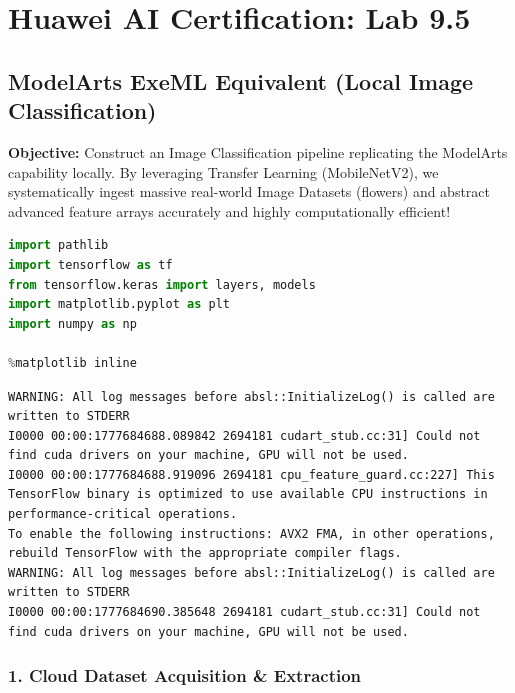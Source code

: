 \hypertarget{huawei-ai-certification-lab-9.5}{%
\section{Huawei AI Certification: Lab
9.5}\label{huawei-ai-certification-lab-9.5}}

\hypertarget{modelarts-exeml-equivalent-local-image-classification}{%
\subsection{ModelArts ExeML Equivalent (Local Image
Classification)}\label{modelarts-exeml-equivalent-local-image-classification}}

\textbf{Objective:} Construct an Image Classification pipeline
replicating the ModelArts capability locally. By leveraging Transfer
Learning (MobileNetV2), we systematically ingest massive real-world
Image Datasets (flowers) and abstract advanced feature arrays accurately
and highly computationally efficient!

\begin{lstlisting}[language=Python]
import pathlib
import tensorflow as tf
from tensorflow.keras import layers, models
import matplotlib.pyplot as plt
import numpy as np

%matplotlib inline
\end{lstlisting}

\begin{lstlisting}
WARNING: All log messages before absl::InitializeLog() is called are written to STDERR
I0000 00:00:1777684688.089842 2694181 cudart_stub.cc:31] Could not find cuda drivers on your machine, GPU will not be used.
I0000 00:00:1777684688.919096 2694181 cpu_feature_guard.cc:227] This TensorFlow binary is optimized to use available CPU instructions in performance-critical operations.
To enable the following instructions: AVX2 FMA, in other operations, rebuild TensorFlow with the appropriate compiler flags.
WARNING: All log messages before absl::InitializeLog() is called are written to STDERR
I0000 00:00:1777684690.385648 2694181 cudart_stub.cc:31] Could not find cuda drivers on your machine, GPU will not be used.
\end{lstlisting}

\hypertarget{cloud-dataset-acquisition-extraction}{%
\subsubsection{1. Cloud Dataset Acquisition \&
Extraction}\label{cloud-dataset-acquisition-extraction}}

